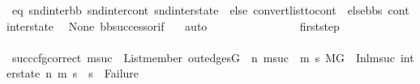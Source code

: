 \begin{isabellebody}
\ eq{\isacharcolon}{\kern0pt}\ {\isachardoublequoteopen}{\isacharparenleft}{\kern0pt}snd{\isacharunderscore}{\kern0pt}inter{\isacharunderscore}{\kern0pt}bb{\isacharcomma}{\kern0pt}\ snd{\isacharunderscore}{\kern0pt}inter{\isacharunderscore}{\kern0pt}cont{\isacharcomma}{\kern0pt}\ snd{\isacharunderscore}{\kern0pt}inter{\isacharunderscore}{\kern0pt}state{\isacharparenright}{\kern0pt}\ {\isacharequal}{\kern0pt}\ {\isacharparenleft}{\kern0pt}else{}{\isacharcomma}{\kern0pt}\ convert{\isacharunderscore}{\kern0pt}list{\isacharunderscore}{\kern0pt}to{\isacharunderscore}{\kern0pt}cont\ {\isacharparenleft}{\kern0pt}\ else{\isacharunderscore}{\kern0pt}bbs{\isacharparenright}{\kern0pt}\ cont{}{\isacharcomma}{\kern0pt}\ inter{\isacharunderscore}{\kern0pt}state{\isacharparenright}{\kern0pt}{\isachardoublequoteclose}\ \isamarkupfalse%
\ None\ bb{\isacharunderscore}{\kern0pt}successor{\isacharunderscore}{\kern0pt}if\ {}\ \isamarkupfalse%
\ auto\isanewline
\isanewline
\ \ \ \ \ \ \ \ \ \ \ \ \ \ \isamarkupfalse%
\ first{\isacharunderscore}{\kern0pt}step\ \isanewline
\ \ \ \ \ \ \ \ \ \ \ \ \ \ \isamarkupfalse%
\ succ{\isacharunderscore}{\kern0pt}cfg{\isacharunderscore}{\kern0pt}correct{\isacharcolon}{\kern0pt}\ {\isachardoublequoteopen}{\isacharparenleft}{\kern0pt}{\isasymforall}msuc{}{\isachardot}{\kern0pt}\ \ List{\isachardot}{\kern0pt}member\ {\isacharparenleft}{\kern0pt}out{\isacharunderscore}{\kern0pt}edges{\isacharparenleft}{\kern0pt}G{\isacharparenright}{\kern0pt}\ {\isacharbang}{\kern0pt}\ n{\isacharparenright}{\kern0pt}\ msuc{}\ {\isasymlongrightarrow}\ {\isacharparenleft}{\kern0pt}{\isasymforall}m{}\ s{}{\isachardot}{\kern0pt}\ {\isacharparenleft}{\kern0pt}{\isacharparenleft}{\kern0pt}M{\isacharcomma}{\kern0pt}{\isasymLambda}{\isacharcomma}{\kern0pt}{\isasymGamma}{\isacharcomma}{\kern0pt}{\isasymOmega}{\isacharcomma}{\kern0pt}G\ {\isasymturnstile}\ {\isacharparenleft}{\kern0pt}Inl{\isacharparenleft}{\kern0pt}msuc{}{\isacharparenright}{\kern0pt}{\isacharcomma}{\kern0pt}\ inter{\isacharunderscore}{\kern0pt}state{\isacharparenright}{\kern0pt}\ {\isacharminus}{\kern0pt}n{\isasymrightarrow}{\isacharasterisk}{\kern0pt}\ {\isacharparenleft}{\kern0pt}m{}{\isacharcomma}{\kern0pt}\ s{}{\isacharparenright}{\kern0pt}{\isacharparenright}{\kern0pt}\ {\isasymlongrightarrow}\ s{}\ {\isasymnoteq}\ Failure{\isacharparenright}{\kern0pt}{\isacharparenright}{\kern0pt}{\isacharparenright}{\kern0pt}{\isachardoublequoteclose}\isanewline

\end{isabellebody}
